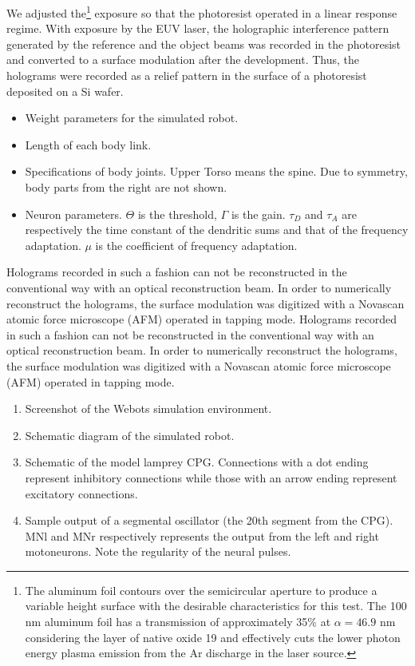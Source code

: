 \documentclass[]{IEEEphot}
\begin{document}
We adjusted the\footnote{The aluminum foil contours over the semicircular aperture to produce a variable height surface with the desirable characteristics for this test. The 100 nm aluminum foil has a transmission of approximately 35\% at $\alpha=46.9$ nm considering the layer of native oxide 19 and effectively cuts the lower photon energy plasma emission from the Ar discharge in the laser source.} exposure so that the photoresist operated in a linear response regime. With exposure by the EUV laser, the holographic interference pattern generated by the reference and the object beams was recorded in the photoresist and converted to a surface modulation after the development.  Thus, the holograms were recorded as a relief pattern in the surface of a photoresist deposited on a Si wafer.
\begin{itemize}
\item Weight parameters for the simulated robot.
\item Length of each body link.
\item Specifications of body joints. Upper Torso means the spine. Due to symmetry, body parts from the right are not shown.
\item Neuron parameters. $\Theta$ is the threshold, $\Gamma$ is the gain. $\tau_{D}$ and $\tau_{A}$ are respectively the time constant of the dendritic sums and that of the frequency adaptation. $\mu$ is the coefficient of frequency adaptation.
\end{itemize}
Holograms recorded in such a fashion can not be reconstructed in the conventional way with an optical reconstruction beam. In order to numerically reconstruct the holograms, the surface modulation was digitized with a Novascan atomic force microscope (AFM) operated in tapping mode. Holograms recorded in such a fashion can not be reconstructed in the conventional way with an optical reconstruction beam. In order to numerically reconstruct the holograms, the surface modulation was digitized with a Novascan atomic force microscope (AFM) operated in tapping mode. 
\begin{enumerate}
\item Screenshot of the Webots simulation environment.
\item Schematic diagram of the simulated robot.
\item Schematic of the model lamprey CPG. Connections with a dot ending represent inhibitory connections while those with an arrow ending represent excitatory connections.
\item Sample output of a segmental oscillator (the 20th segment from the CPG). MNl and MNr respectively represents the output from the left and right motoneurons. Note the regularity of the neural pulses.
\end{enumerate}
\end{document}
